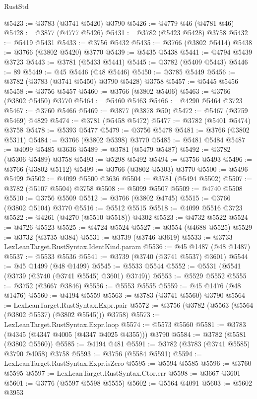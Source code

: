 \begin{lexlean}{RustStd}
\begin{coremodule}
@5423 := @3783 (@3741 @5420) @3790
@5426 := @4779 @46 (@4781 @46)
@5428 := @3877 (@4777 @5426)
@5431 := @3782 (@5423 @5428) @3758
@5432 := @5419 @5431
@5433 := @3756 @5432
@5435 := @3766 (@3802 @5414)
@5438 := @3766 (@3802 @5420) @3770
@5439 := @5435 @5438
@5441 := @4794 @5439 @3723
@5443 := @3781 (@5433 @5441)
@5445 := @3782 (@5409 @5443)
@5446 := 89
@5449 := @45 @5446 (@48 @5446)
@5450 := @3785 @5449
@5456 := @3782 (@3783 (@3741 @5450) @3790 @5428) @3758
@5457 := @5445 @5456
@5458 := @3756 @5457
@5460 := @3766 (@3802 @5406)
@5463 := @3766 (@3802 @5450) @3770
@5464 := @5460 @5463
@5466 := @4290 @5464 @3723
@5467 := @3760 @5466
@5469 := @3877 (@3878 @50)
@5472 := @5467 (@3759 @5469) @4829
@5474 := @3781 (@5458 @5472)
@5477 := @3782 (@5401 @5474) @3758
@5478 := @5393 @5477
@5479 := @3756 @5478
@5481 := @3766 (@3802 @5311)
@5484 := @3766 (@3802 @5398) @3770
@5485 := @5481 @5484
@5487 := @4099 @5485 @3636
@5489 := @3781 (@5479 @5487)
@5492 := @3782 (@5306 @5489) @3758
@5493 := @5298 @5492
@5494 := @3756 @5493
@5496 := @3766 (@3802 @5112)
@5499 := @3766 (@3802 @5303) @3770
@5500 := @5496 @5499
@5502 := @4099 @5500 @3636
@5504 := @3781 (@5494 @5502)
@5507 := @3782 (@5107 @5504) @3758
@5508 := @5099 @5507
@5509 := @4740 @5508
@5510 := @3756 @5509
@5512 := @3766 (@3802 @4745)
@5515 := @3766 (@3802 @5104) @3770
@5516 := @5512 @5515
@5518 := @4099 @5516 @3723
@5522 := @4261 (@4270 (@5510 @5518)) @4302
@5523 := @4732 @5522
@5524 := @4726 @5523
@5525 := @4724 @5524
@5527 := @3554 (@4688 @5525)
@5529 := @3732 (@3735 @384)
@5531 := @3739 (@3746 @3619)
@5533 := @3733 LexLeanTarget.RustSyntax.IdentKind.param
@5536 := @45 @1487 (@48 @1487)
@5537 := @5533 @5536
@5541 := @3739 (@3740 (@3741 @5537) @3601)
@5544 := @45 @1499 (@48 @1499)
@5545 := @5533 @5544
@5552 := @5531 (@5541 (@3739 (@3740 (@3741 @5545) @3601) @3749))
@5553 := @5529 @5552
@5555 := @3752 (@3667 @3846)
@5556 := @5553 @5555
@5559 := @45 @1476 (@48 @1476)
@5560 := @4194 @5559
@5563 := @3783 (@3741 @5560) @3790
@5564 := LexLeanTarget.RustSyntax.Expr.pair
@5572 := @3756 (@3782 (@5563 (@5564 (@3802 @5537) (@3802 @5545))) @3758)
@5573 := LexLeanTarget.RustSyntax.Expr.loop
@5574 := @5573 @5560
@5581 := @3783 (@4345 (@4347 @4005 (@4347 @4025 @4355))) @3790
@5584 := @3782 (@5581 (@3802 @5560))
@5585 := @4194 @481
@5591 := @3782 (@3783 (@3741 @5585) @3790 @4058) @3758
@5593 := @3756 (@5584 @5591)
@5594 := LexLeanTarget.RustSyntax.Expr.isZero
@5595 := @5594 @5585
@5596 := @3760 @5595
@5597 := LexLeanTarget.RustSyntax.Ctor.err
@5598 := @3667 @3601
@5601 := @3776 (@5597 @5598 @5555)
@5602 := @5564 @4091
@5603 := @5602 @3953

\end{coremodule}
\end{lexlean}
